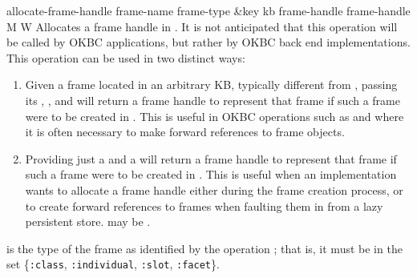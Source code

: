 \begin{okbcop}{allocate-frame-handle}{ frame-name frame-type \&key kb frame-handle} { frame-handle } { M } { W } {  }
Allocates a frame handle in .  It is not anticipated that this
   operation will be called by OKBC applications, but rather by OKBC back end
   implementations.  This operation can be used in two distinct ways:
   \begin{enumerate}
   \item Given a frame located in an arbitrary KB, typically different
   from , passing its , , and
    will return a frame handle to represent that frame if
   such a frame were to be created in .  This is useful in OKBC
   operations such as  and  where it is often
   necessary to make forward references to frame objects.  
   \item Providing just a  and a 
   will return a frame handle to represent that frame if such a frame were
   to be created in .  This is useful when an implementation wants
   to allocate a frame handle either during the frame creation process, or
   to create forward references to frames when faulting them in from a
   lazy persistent store.   may be \false.
   \end{enumerate}
    is the type of the frame as identified by the operation
   ; that is, it must be in the set \{{\tt :class},
   {\tt :individual}, {\tt :slot}, {\tt :facet}\}.


\end{okbcop}
